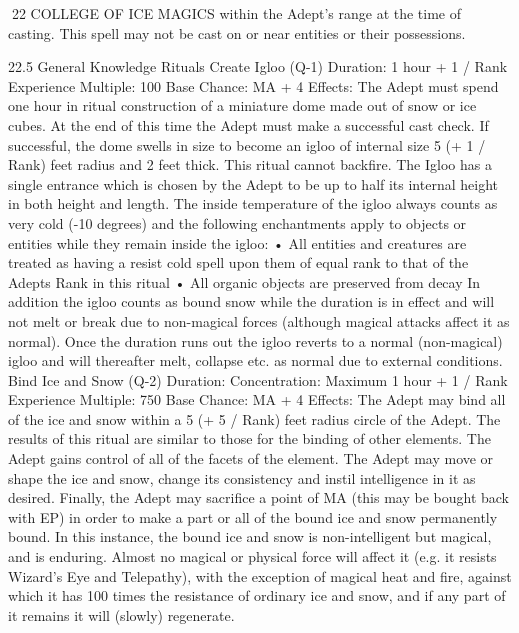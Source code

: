 \documentclass[a4paper]{article}
\begin{document}
\begin{multicols}{3}
22 COLLEGE OF ICE MAGICS
within the Adept’s range at the time of casting.
This spell may not be cast on or near entities or
their possessions.

22.5 General Knowledge Rituals
Create Igloo (Q-1)
Duration: 1 hour + 1 / Rank
Experience Multiple: 100
Base Chance: MA + 4%
Effects: The Adept must spend one hour in ritual
construction of a miniature dome made out of snow
or ice cubes. At the end of this time the Adept must
make a successful cast check. If successful, the
dome swells in size to become an igloo of internal
size 5 (+ 1 / Rank) feet radius and 2 feet thick. This
ritual cannot backfire. The Igloo has a single entrance which is chosen by the Adept to be up to
half its internal height in both height and length.
The inside temperature of the igloo always counts
as very cold (-10 degrees) and the following enchantments apply to objects or entities while they
remain inside the igloo:
• All entities and creatures are treated as having a
resist cold spell upon them of equal rank to that of
the Adepts Rank in this ritual
• All organic objects are preserved from decay
In addition the igloo counts as bound snow while
the duration is in effect and will not melt or break
due to non-magical forces (although magical attacks affect it as normal). Once the duration runs
out the igloo reverts to a normal (non-magical)
igloo and will thereafter melt, collapse etc. as
normal due to external conditions.
Bind Ice and Snow (Q-2)
Duration: Concentration: Maximum 1 hour + 1 /
Rank
Experience Multiple: 750
Base Chance: MA + 4%
Effects: The Adept may bind all of the ice and
snow within a 5 (+ 5 / Rank) feet radius circle of
the Adept. The results of this ritual are similar to
those for the binding of other elements. The Adept
gains control of all of the facets of the element.
The Adept may move or shape the ice and snow,
change its consistency and instil intelligence in it
as desired. Finally, the Adept may sacrifice a point
of MA (this may be bought back with EP) in order
to make a part or all of the bound ice and snow
permanently bound. In this instance, the bound ice
and snow is non-intelligent but magical, and is
enduring. Almost no magical or physical force will
affect it (e.g. it resists Wizard’s Eye and Telepathy), with the exception of magical heat and fire,
against which it has 100 times the resistance of
ordinary ice and snow, and if any part of it remains
it will (slowly) regenerate.


\end{multicols}
\end{document}
